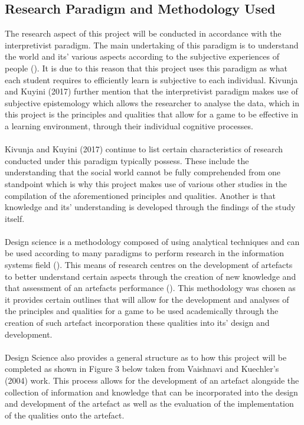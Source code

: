 \subsection{Research Paradigm and Methodology Used}
The research aspect of this project will be conducted in accordance with the interpretivist paradigm. The main undertaking of this paradigm is to understand the world and its’ various aspects according to the subjective experiences of people (\cite{kivunja2017understanding}). It is due to this reason that this project uses this paradigm as what each student requires to efficiently learn is subjective to each individual. Kivunja and Kuyini  (2017) further mention that the interpretivist paradigm makes use of subjective epistemology which allows the researcher to analyse the data, which in this project is the principles and qualities that allow for a game to be effective in a learning environment, through their individual cognitive processes. 
\\\\
Kivunja and Kuyini (2017) continue to list certain characteristics of research conducted under this paradigm typically possess. These include the understanding that the social world cannot be fully comprehended from one standpoint which is why this project makes use of various other studies in the compilation of the aforementioned principles and qualities. Another is that knowledge and its’ understanding is developed through the findings of the study itself.
\\\\
Design science is a methodology composed of using analytical techniques and can be used according to many paradigms to perform research in the information systems field (\cite{vaishnavi2004design}). This means of research centres on the development of artefacts to better understand certain aspects through the creation of new knowledge and that assessment of an artefacts performance (\cite{vaishnavi2004design}). This methodology was chosen as it provides certain outlines that will allow for the development and analyses of the principles and qualities for a game to be used academically through the creation of such artefact incorporation these qualities into its’ design and development. 
\\\\
Design Science also provides a general structure as to how this project will be completed as shown in Figure 3 below taken from Vaishnavi and Kuechler’s (2004) work. This process allows for the development of an artefact alongside the collection of information and knowledge that can be incorporated into the design and development of the artefact as well as the evaluation of the implementation of the qualities onto the artefact.

